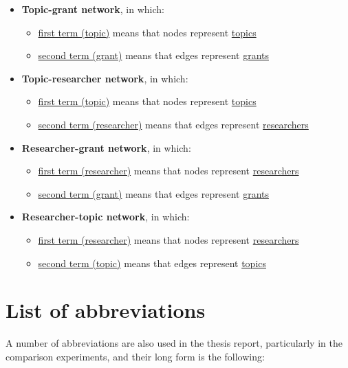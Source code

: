 \begin{itemize}[noitemsep]
    \item \textbf{Topic-grant network}, in which:
    \begin{itemize}[noitemsep]
        \item \underline{first term (topic)} means that nodes represent \underline{topics}
        \item \underline{second term (grant)} means that edges represent \underline{grants}
    \end{itemize}
    \item \textbf{Topic-researcher network}, in which:
    \begin{itemize}
        \item \underline{first term (topic)} means that nodes represent \underline{topics}
        \item \underline{second term (researcher)} means that edges represent \underline{researchers}
    \end{itemize}
    \item \textbf{Researcher-grant network}, in which:
    \begin{itemize}
        \item \underline{first term (researcher)} means that nodes represent \underline{researchers}
        \item \underline{second term (grant)} means that edges represent \underline{grants}
    \end{itemize}
    \item \textbf{Researcher-topic network}, in which:
    \begin{itemize}
        \item \underline{first term (researcher)} means that nodes represent \underline{researchers}
        \item \underline{second term (topic)} means that edges represent \underline{topics}
    \end{itemize}
\end{itemize}

\clearpage

\section{List of abbreviations}

A number of abbreviations are also used in the thesis report, particularly in the comparison experiments, and their long form is the following:


